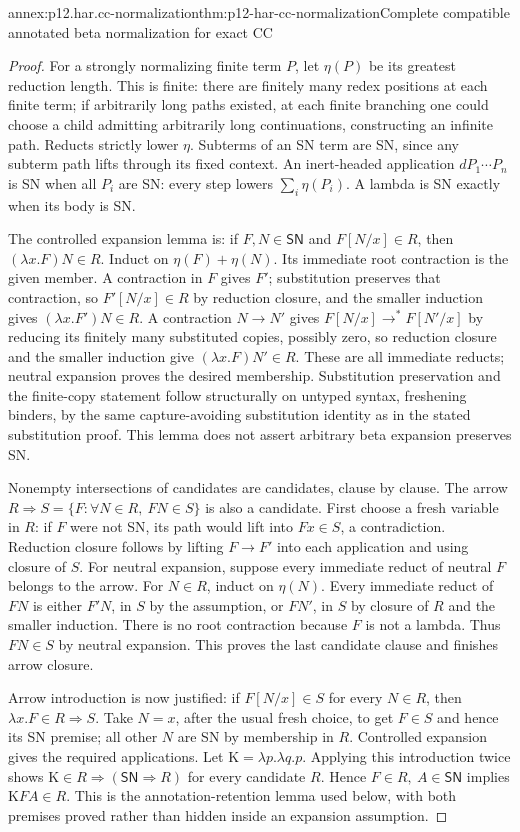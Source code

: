 \begin{annexitem}{annex:p12.har.cc-normalization}{thm:p12-har-cc-normalization}{Complete compatible annotated beta normalization for exact CC}
\begin{proof}
For a strongly normalizing finite term \(P\), let \(\eta(P)\) be its
greatest reduction length. This is finite: there are finitely many redex
positions at each finite term; if arbitrarily long paths existed, at
each finite branching one could choose a child admitting arbitrarily
long continuations, constructing an infinite path. Reducts strictly
lower \(\eta\). Subterms of an SN term are SN, since any subterm path
lifts through its fixed context. An inert-headed application
\(dP_1\cdots P_n\) is SN when all \(P_i\) are SN: every step lowers
\(\sum_i\eta(P_i)\). A lambda is SN exactly when its body is SN.

The controlled expansion lemma is: if \(F,N\in\mathsf{SN}\) and
\(F[N/x]\in R\), then \((\lambda x.F)N\in R\).
Induct on \(\eta(F)+\eta(N)\). Its immediate root contraction is
the given member. A contraction in \(F\) gives \(F'\); substitution
preserves that contraction, so \(F'[N/x]\in R\) by reduction closure,
and the smaller induction gives \((\lambda x.F')N\in R\).
A contraction \(N\to N'\) gives
\(F[N/x]\to^*F[N'/x]\) by reducing its finitely many substituted
copies, possibly zero, so reduction closure and the smaller induction
give \((\lambda x.F)N'\in R\). These are all immediate reducts;
neutral expansion proves the desired membership. Substitution preservation
and the finite-copy statement follow structurally on untyped syntax,
freshening binders, by the same capture-avoiding substitution identity
as in the stated substitution proof. This lemma does not assert
arbitrary beta expansion preserves SN.

Nonempty intersections of candidates are candidates, clause by clause.
The arrow
\(R\Rightarrow S=\{F:\forall N\in R,\ FN\in S\}\)
is also a candidate. First choose a fresh variable in \(R\): if
\(F\) were not SN, its path would lift into \(Fx\in S\), a
contradiction. Reduction closure follows by lifting \(F\to F'\)
into each application and using closure of \(S\). For neutral
expansion, suppose every immediate reduct of neutral \(F\) belongs
to the arrow. For \(N\in R\), induct on \(\eta(N)\).
Every immediate reduct of \(FN\) is either \(F'N\), in \(S\)
by the assumption, or \(FN'\), in \(S\) by closure of \(R\) and
the smaller induction. There is no root contraction because \(F\)
is not a lambda. Thus \(FN\in S\) by neutral expansion. This proves
the last candidate clause and finishes arrow closure.

Arrow introduction is now justified: if \(F[N/x]\in S\) for every
\(N\in R\), then \(\lambda x.F\in R\Rightarrow S\).
Take \(N=x\), after the usual fresh choice, to get \(F\in S\)
and hence its SN premise; all other \(N\) are SN by membership in
\(R\). Controlled expansion gives the required applications.
Let \(\mathrm K=\lambda p.\lambda q.p\). Applying this introduction
twice shows \(\mathrm K\in R\Rightarrow(\mathsf{SN}\Rightarrow R)\)
for every candidate \(R\). Hence
\(F\in R,\ A\in\mathsf{SN}\) implies \(\mathrm KFA\in R\).
This is the annotation-retention lemma used below, with both premises
proved rather than hidden inside an expansion assumption.


\end{proof}
\end{annexitem}
